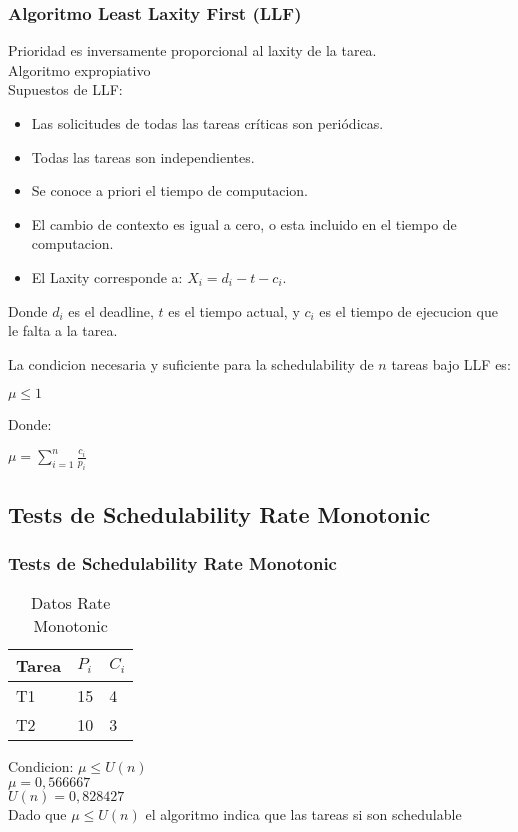\documentclass[xcolor=table]{beamer}
\begin{document}
\begin{frame} 
\frametitle{Algoritmo Least Laxity First (LLF)} 

Prioridad es inversamente proporcional al laxity de la tarea. \\
Algoritmo expropiativo\\
Supuestos de LLF:
\begin{itemize}
\item Las solicitudes de todas las tareas críticas son periódicas.
\item Todas las tareas son independientes.
\item Se conoce a priori el tiempo de computacion.
\item El cambio de contexto es igual a cero, o esta incluido en el tiempo de computacion.
\item El Laxity corresponde a: $X_i = d_i - t - c_i$.
\end{itemize} 

Donde $d_i$ es el deadline, $t$ es el tiempo actual, y $c_i$ es el tiempo de ejecucion que le falta a la tarea.

La condicion necesaria y suficiente para la schedulability de $n$ tareas bajo LLF es:
\begin{center}
$\mu \leq 1$
\end{center}

Donde:
\begin{center}
$\mu = \sum_{i=1}^{n}\frac{c_i}{p_i}$
\end{center}

\end{frame}

\subsection{Tests de Schedulability  Rate Monotonic } 

\begin{frame} 
\frametitle{Tests de Schedulability  Rate Monotonic } 
\begin{table} 
\centering 
\begin{tabular}{|l|l|l|} 
\hline 
\cellcolor{lightgray}Tarea & \cellcolor{lightgray}$P_i$ & \cellcolor{lightgray}$C_i$ \\ \hline 
T1   & 15  &  4\\ \hline 
T2   & 10  &  3\\ \hline 
\end{tabular} 
\caption{Datos  Rate Monotonic } 
\end{table} 
Condicion: $\mu \leq U(n)$ \\ 
$\mu =  0,566667 $ \\ 
$U(n) =  0,828427 $ \\ 
Dado que $\mu \leq U(n)$ el algoritmo indica que las tareas si son schedulable \\ 
\end{frame} 
\end{document}
